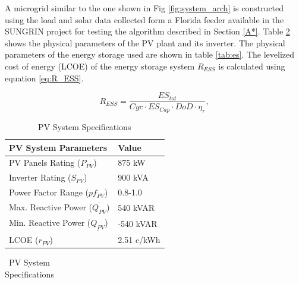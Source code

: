 A microgrid similar to the one shown in Fig \ref{fig:system_arch} is constructed using the load and solar data collected form a Florida feeder available in the SUNGRIN project \cite{SUNGRIN} for testing the algorithm described in Section \ref{A*}. Table \ref{tab:solar_pv} shows the physical parameters of the PV plant and its inverter. The physical parameters of the energy storage used are shown in table \ref{tab:es}. The levelized cost of energy (LCOE)  of the energy storage system $R_{ESS}$ is calculated using equation \ref{eq:R_ESS}.

\begin{equation}
\label{eq:R_ESS}
R_{ESS} = \dfrac{ES_{tot}}{Cyc\cdot ES_{Cap}\cdot DoD\cdot \eta_{r}},
\end{equation}

\begin{table}[htb]
\normalsize
\renewcommand{\arraystretch}{1}
\caption{PV System Specifications}
\label{tab:solar_pv}
\centering
    \begin{tabular}{ | l | p{3cm} | }
    \hline
    \textbf{PV System Parameters} & \textbf{Value} \\ \hline
    PV Panels Rating (\(P_{PV}\)) & 875 kW  \\ \hline
    Inverter Rating (\(S_{PV}\)) & 900 kVA \\ \hline
    Power Factor Range (\(pf_{PV}\)) & 0.8-1.0  \\ \hline
    Max. Reactive Power (\(\overline{Q_{PV}}\)) & 540 kVAR \\ \hline
    Min. Reactive Power (\(\underline{Q_{PV}}\)) & -540 kVAR \\ \hline
    LCOE (\(r_{PV}\)) & 2.51 c/kWh \\ \hline
    \end{tabular}
    \begin{tabular}{l}
    \end{tabular}
\end{table}


